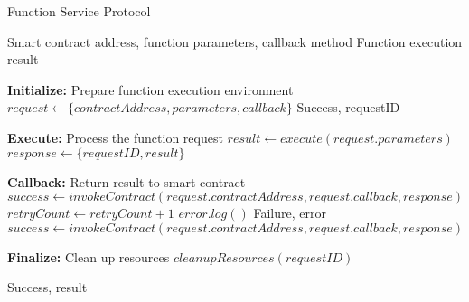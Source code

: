 
\begin{algorithm}
\caption{Function Service Protocol}
\label{alg:function}
\begin{algorithmic}[1]
\Require Smart contract address, function parameters, callback method
\Ensure Function execution result

\State \textbf{Initialize:} Prepare function execution environment
\State $request \gets \{contractAddress, parameters, callback\}$
    \State \Return Success, requestID
\EndIf

\State \textbf{Execute:} Process the function request
\State $result \gets execute(request.parameters)$
\State $response \gets \{requestID, result\}$

\State \textbf{Callback:} Return result to smart contract
\State $success \gets invokeContract(request.contractAddress, request.callback, response)$
    \State $retryCount \gets retryCount + 1$
            \State $error.log()$
            \State \Return Failure, error
        \EndIf
    \EndIf
        \State $success \gets invokeContract(request.contractAddress, request.callback, response)$
    \EndIf
\EndWhile

\State \textbf{Finalize:} Clean up resources
\State $cleanupResources(requestID)$

\State \Return Success, result
\end{algorithmic}
\end{algorithm} 